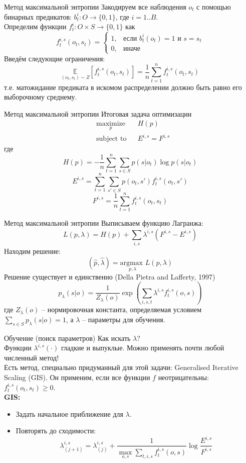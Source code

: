 \documentclass{beamer}
\begin{document}
\begin{frame}{Метод максимальной энтропии}
Закодируем все наблюдения $o_t$ с помощью бинарных предикатов: $b_t^i:O \rightarrow \{0,1\}$, где $i=1..B$.\\
Определим функции $f_t^i:O\times S \rightarrow \{0,1\}$ как
$$f_t^{i,s}(o_t,s_t) = \begin{cases} 1, & \mbox{если } b_t^i(o_t)=1\mbox{ и } s=s_t\\ 0, & \mbox{иначе}\end{cases}$$
Введём следующие ограничения:
$$\underset{(o_t,s_t) \sim Z}{\mathbb{E}} [f_t^{i,s}(o_t,s_t)] = \frac{1}{n} \sum_{t=1}^{n} f_t^{i,s}(o_t,s_t)$$
т.е. матожидание предиката в искомом распределении должно быть равно его выборочному среднему.
\end{frame}

\begin{frame}{Метод максимальной энтропии}
Итоговая задача оптимизации
\begin{equation*}
\begin{aligned}
& \underset{p}{\text{maximize}}
& & H(p) \\
& \text{subject to}
& & E^{i,s} = F^{i,s}
\end{aligned}
\end{equation*}
где
$$H(p)=- \frac{1}{n} \sum_{t=1}^{n} \sum_{s \in S} p(s|o_t) \log p(s|o_t)$$
$$E^{i,s} = \sum_{t=1}^{n} \sum_{s' \in S} p(o_t,s') f_t^{i,s}(o_t,s')$$
$$F^{i,s} = \frac{1}{n} \sum_{t=1}^{n} f_t^{i,s}(o_t,s_t)$$
\end{frame}

\begin{frame}{Метод максимальной энтропии}
Выписываем функцию Лагранжа:
$$L(p,\lambda) = H(p) + \sum_{i,s}\lambda^{i,s} (F^{i,s} - E^{i,s})$$
Находим решение:
$$(\hat{p},\hat{\lambda}) = \underset{p,\lambda}{\text{argmax }} L(p,\lambda)$$
Решение существует и единственно (Della Pietra and Lafferty, 1997)
$$p_{\lambda}(s|o) = \frac{1}{Z_{\lambda}(o)} \exp \left( \sum_{i,s,t} \lambda^{i,s} f_t^{i,s}(o,s) \right)$$
где $Z_{\lambda}(o)$ -- нормировочная константа, определяемая условием $\sum_{s \in S} p_{\lambda}(s|o) = 1$, а $\lambda$ -- параметры для обучения.
\end{frame}

\begin{frame}{Обучение (поиск параметров)}
Как искать $\lambda$?\\
Функции $\lambda^{i,s}(\cdot)$ гладкие и выпуклые. Можно применять почти любой численный метод!\\
Есть метод, специально придуманный для этой задачи: Generalised Iterative Scaling (GIS). Он применим, если все функции $f$ неотрицательны: $f_t^{i,s}(o_t,s_t) \ge 0$.\\
\textbf{GIS:}
\begin{itemize}
\item Задать начальное приближение для $\lambda$.
\item Повторять до сходимости:
$$\lambda_{(j+1)}^{i,s}=\lambda_{(j)}^{i,s} + \frac{1}{\underset{o,s}{\max} \underset{t,i,s}{\sum} f_t^{i,s}(o,s)} \log \frac{E^{i,s}}{F^{i,s}}$$
\end{itemize}
\end{frame}
\end{document}

